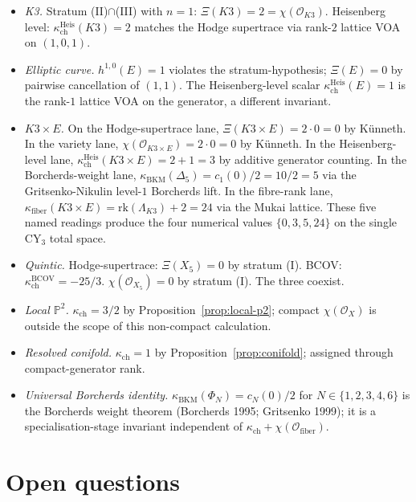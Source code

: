 \documentclass[11pt]{article}
\providecommand{\cO}{\mathcal{O}}
\providecommand{\rk}{\mathrm{rk}}
\begin{document}
\begin{itemize}
\item \emph{K3.} Stratum (II)$\cap$(III) with $n=1$:
      $\Xi(K3)=2=\chi(\cO_{K3})$. Heisenberg level:
      $\kappa_{\mathrm{ch}}^{\mathrm{Heis}}(K3)=2$ matches the Hodge
      supertrace via rank-$2$ lattice VOA on $(1,0,1)$.
\item \emph{Elliptic curve.} $h^{1,0}(E)=1$ violates the
      stratum-hypothesis; $\Xi(E)=0$ by pairwise cancellation of
      $(1,1)$. The Heisenberg-level scalar
      $\kappa_{\mathrm{ch}}^{\mathrm{Heis}}(E)=1$ is the rank-$1$ lattice
      VOA on the generator, a different invariant.
\item \emph{$K3\times E$.} On the Hodge-supertrace lane,
      $\Xi(K3\times E)=2\cdot 0=0$ by K\"unneth. In the variety lane,
      $\chi(\cO_{K3\times E})=2\cdot 0=0$ by K\"unneth. In the
      Heisenberg-level lane,
      $\kappa_{\mathrm{ch}}^{\mathrm{Heis}}(K3\times E)=2+1=3$ by
      additive generator counting. In the Borcherds-weight lane,
      $\kappa_{\mathrm{BKM}}(\Delta_{5})=c_{1}(0)/2=10/2=5$ via the
      Gritsenko-Nikulin level-$1$ Borcherds lift. In the fibre-rank
      lane, $\kappa_{\mathrm{fiber}}(K3\times E)=\rk(\Lambda_{K3})+2=24$
      via the Mukai lattice. These five named readings produce the four
      numerical values $\{0,3,5,24\}$ on the single CY$_3$ total space.
\item \emph{Quintic.} Hodge-supertrace: $\Xi(X_{5})=0$ by stratum (I).
      BCOV: $\kappa_{\mathrm{ch}}^{\mathrm{BCOV}}=-25/3$.
      $\chi(\cO_{X_{5}})=0$ by stratum (I). The three coexist.
\item \emph{Local $\mathbb{P}^{2}$.} $\kappa_{\mathrm{ch}}=3/2$ by
      Proposition~\ref{prop:local-p2}; compact $\chi(\cO_X)$ is outside
      the scope of this non-compact calculation.
\item \emph{Resolved conifold.} $\kappa_{\mathrm{ch}}=1$ by
      Proposition~\ref{prop:conifold}; assigned through compact-generator
      rank.
\item \emph{Universal Borcherds identity.} $\kappa_{\mathrm{BKM}}(\Phi_N)=c_N(0)/2$
      for $N\in\{1,2,3,4,6\}$ is the Borcherds weight theorem (Borcherds
      1995; Gritsenko 1999); it is a specialisation-stage invariant
      independent of $\kappa_{\mathrm{ch}}+\chi(\cO_{\mathrm{fiber}})$.
\end{itemize}

\section{Open questions}
\label{sec:open}
\end{document}
